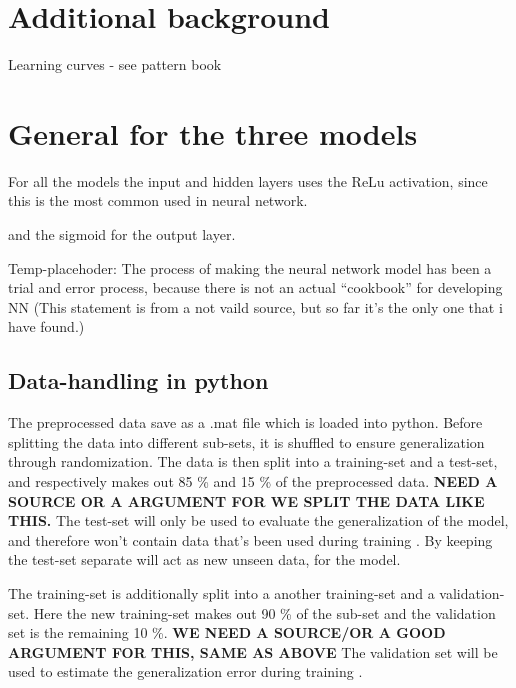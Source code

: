 \section{Additional background}
Learning curves - see pattern book


\section{General for the three models}

For all the models the input and hidden layers uses the ReLu activation, since this is the most common used in neural network. \citep{Goodfellow2016} %

and the sigmoid for the output layer.  




Temp-placehoder:
The process of making the neural network model has been a trial and error process, because there is not an actual “cookbook” for developing NN (This statement is from a not vaild source, but so far it’s the only one that i have found.)  

\subsection{Data-handling in python}
The preprocessed data save as a .mat file which is loaded into python. Before splitting the data into different sub-sets, it is shuffled to ensure generalization through randomization. The data is then split into a training-set and a test-set, and respectively makes out 85 \% and 15 \% of the preprocessed data. \textbf{NEED A SOURCE OR A ARGUMENT FOR WE SPLIT THE DATA LIKE THIS.} The test-set will only be used to evaluate the generalization of the model, and therefore won't contain data that's been used during training \citep{Duda2000}. 
By keeping the test-set separate will act as new unseen data, for the model.  

The training-set is additionally split into a another training-set and a validation-set. Here the new training-set makes out 90 \% of the sub-set and the validation set is the remaining 10 \%. \textbf{WE NEED A SOURCE/OR A GOOD ARGUMENT FOR THIS, SAME AS ABOVE} 
The validation set will be used to estimate the generalization error during training \citep{Duda2000}.  

